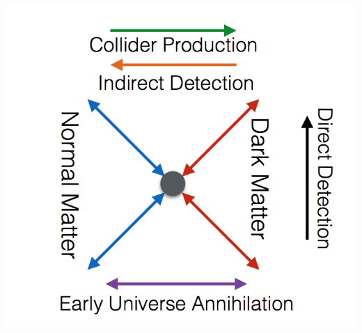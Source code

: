 \documentclass[aspectratio=169]{beamer}
\begin{document}
\begin{frame}
\begin{columns}
        
        \includegraphics[width=\textwidth]{figures/DM_diagram.png}
    \end{columns}

\end{frame}
\end{document}
